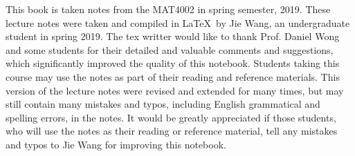 
\tableofcontents






%
%

%


\acknowledgments
This book is taken notes from the MAT4002 in spring semester, 2019. These lecture notes were taken and compiled in \LaTeX~by Jie Wang, an undergraduate student in spring 2019. 
The tex writter would like to thank Prof. Daniel Wong and some students for their detailed and valuable comments and suggestions, which significantly improved the quality of this notebook.
Students taking this course may use the notes as part of their reading and reference materials. 
This version of the lecture notes were revised and extended for many times, but may still contain many mistakes and typos, including English grammatical and spelling errors, in the notes. 
It would be greatly appreciated if those students, who will use the notes as their reading or reference material, tell any mistakes and typos to Jie Wang for improving this notebook.




